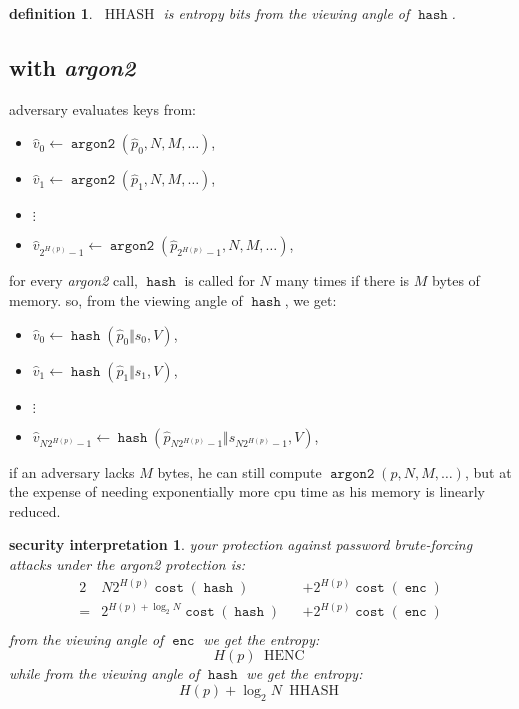 \documentclass[twocolumn]{article}
\newtheorem{security}{security interpretation}
\newtheorem{definition}{definition}
\DeclareMathOperator{\enc}{\mathtt{enc}}
\DeclareMathOperator{\hash}{\mathtt{hash}}
\DeclareMathOperator{\argon}{\mathtt{argon2}}
\DeclareMathOperator{\cost}{\mathtt{cost}}
\DeclareMathOperator{\henc}{\; HENC}
\DeclareMathOperator{\hhash}{\; HHASH}
\begin{document}
\begin{definition}
$\hhash$ is entropy bits from the viewing angle of  $\hash$.
\end{definition}

\subsection{with \emph{argon2}}
adversary evaluates keys from:
\begin{itemize}
    \item $\hat v_0 \gets \argon(\hat p_0, N, M, \ldots)$,
    \item $\hat v_1 \gets \argon(\hat p_1, N, M, \ldots)$,
    \item $\vdots$
    \item $\hat v_{2^{H(p)}-1} \gets \argon(\hat p_{2^{H(p)}-1}, N, M,
    \ldots)$,
\end{itemize}

for every \emph{argon2} call, $\hash$ is called for $N$ many times if there
is $M$ bytes of memory.  so, from the viewing angle of $\hash$, we get:
\begin{itemize}
    \item $\hat v_0 \gets \hash(\hat p_0 \Vert s_0, V)$,
    \item $\hat v_1 \gets \hash(\hat p_1 \Vert s_1, V)$,
    \item $\vdots$
    \item $\hat v_{N2^{H(p)}-1} \gets \hash(\hat p_{N2^{H(p)}-1}
    \Vert s_{N2^{H(p)}-1}, V)$,
\end{itemize}

if an adversary lacks $M$ bytes, he can still compute $\argon(p, N, M,
\ldots)$, but at the expense of needing exponentially more cpu time as his
memory is linearly reduced.

\begin{security}
your protection against password brute-forcing attacks under the
\emph{argon2} protection is:
\begin{alignat*}{2}
        & N 2^{H(p)} \cost(\hash)          && + 2^{H(p)} \cost(\enc) \\
    ={} & 2^{H(p) + \log_2 N} \cost(\hash) && + 2^{H(p)} \cost(\enc) \\
\end{alignat*}
from the viewing angle of $\enc$ we get the entropy:
\[
    H(p) \henc
\]
while from the viewing angle of $\hash$ we get the entropy:
\[
    H(p) + \log_2 N \hhash
\]
\end{security}
\end{document}
